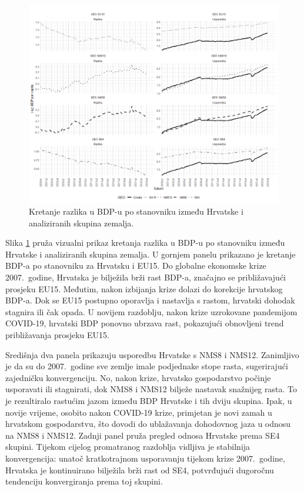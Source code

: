 \documentclass{crebsshr}
\begin{document}
\begin{figure}[ht]
\centering
\includegraphics[width=\linewidth]{Rplot.png} %
\caption{Kretanje razlika u BDP-u po stanovniku između Hrvatske i analiziranih skupina zemalja.}
\label{fig:grafikon1}
\end{figure}

Slika \ref{fig:grafikon1} pruža vizualni prikaz kretanja razlika u BDP-u po stanovniku između Hrvatske i analiziranih skupina zemalja. U gornjem panelu prikazano je kretanje BDP-a po stanovniku za Hrvatsku i EU15. Do globalne ekonomske krize 2007.\ godine, Hrvatska je bilježila brži rast BDP-a, značajno se približavajući prosjeku EU15. Međutim, nakon izbijanja krize dolazi do korekcije hrvatskog BDP-a. Dok se EU15 postupno oporavlja i nastavlja s rastom, hrvatski dohodak stagnira ili čak opada. U novijem razdoblju, nakon krize uzrokovane pandemijom COVID-19, hrvatski BDP ponovno ubrzava rast, pokazujući obnovljeni trend približavanja prosjeku EU15.

Središnja dva panela prikazuju usporedbu Hrvatske s NMS8 i NMS12. Zanimljivo je da su do 2007.\ godine sve zemlje imale podjednake stope rasta, sugerirajući zajedničku konvergenciju. No, nakon krize, hrvatsko gospodarstvo počinje usporavati ili stagnirati, dok NMS8 i NMS12 bilježe nastavak snažnijeg rasta. To je rezultiralo rastućim jazom između BDP Hrvatske i tih dviju skupina. Ipak, u novije vrijeme, osobito nakon COVID-19 krize, primjetan je novi zamah u hrvatskom gospodarstvu, što dovodi do ublažavanja dohodovnog jaza u odnosu na NMS8 i NMS12. Zadnji panel pruža pregled odnosa Hrvatske prema SE4 skupini. Tijekom cijelog promatranog razdoblja vidljiva je stabilnija konvergencija: unatoč kratkotrajnom usporavanju tijekom krize 2007.\ godine, Hrvatska je kontinuirano bilježila brži rast od SE4, potvrđujući dugoročnu tendenciju konvergiranja prema toj skupini.
\end{document}
